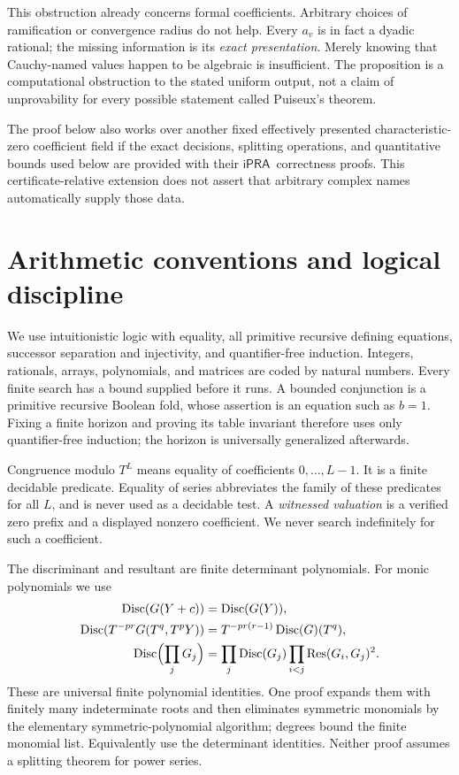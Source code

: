 \documentclass[11pt]{article}
\theoremstyle{definition}
\newcommand{\ipra}{\ensuremath{\mathsf{iPRA}}}
\newcommand{\disc}{\operatorname{Disc}}
\newcommand{\Res}{\operatorname{Res}}
\begin{document}
This obstruction already concerns formal coefficients. Arbitrary choices of
ramification or convergence radius do not help. Every \(a_v\) is in fact a
dyadic rational; the missing information is its \emph{exact presentation}.
Merely knowing that Cauchy-named values happen to be algebraic is insufficient.
The proposition is a computational obstruction to the stated uniform output,
not a claim of unprovability for every possible statement called Puiseux's
theorem.

The proof below also works over another fixed effectively presented
characteristic-zero coefficient field if the exact decisions, splitting
operations, and quantitative bounds used below are provided with their
\ipra\ correctness proofs. This certificate-relative extension does not
assert that arbitrary complex names automatically supply those data.

\section{Arithmetic conventions and logical discipline}
\label{sec:arithmetic}
We use intuitionistic logic with equality, all primitive recursive defining
equations, successor separation and injectivity, and quantifier-free
induction. Integers, rationals, arrays, polynomials, and matrices are coded
by natural numbers. Every finite search has a bound supplied before it runs.
A bounded conjunction is a primitive recursive Boolean fold, whose assertion
is an equation such as \(b=1\). Fixing a finite horizon and proving its
table invariant therefore uses only quantifier-free induction; the horizon
is universally generalized afterwards.

Congruence modulo \(T^L\) means equality of coefficients
\(0,\ldots,L-1\). It is a finite decidable predicate.
Equality of series abbreviates the family of these predicates for all \(L\),
and is never used as a decidable test.
A \emph{witnessed valuation} is a verified zero prefix and a displayed
nonzero coefficient. We never search indefinitely for such a coefficient.

The discriminant and resultant are finite determinant polynomials. For
monic polynomials we use
\begin{align}
 \disc(G(Y+c))&=\disc(G(Y)),\label{eq:disc-translation}\\
 \disc(T^{-pr}G(T^q,T^pY))
   &=T^{-pr(r-1)}\disc(G)(T^q),\label{eq:disc-scale}\\
 \disc\Bigl(\prod_jG_j\Bigr)
   &=\prod_j\disc(G_j)\prod_{i<j}\Res(G_i,G_j)^2.
   \label{eq:disc-product}
\end{align}
These are universal finite polynomial identities. One proof expands them
with finitely many indeterminate roots and then eliminates symmetric
monomials by the elementary symmetric-polynomial algorithm; degrees bound
the finite monomial list. Equivalently use the determinant identities.
Neither proof assumes a splitting theorem for power series.
\end{document}
